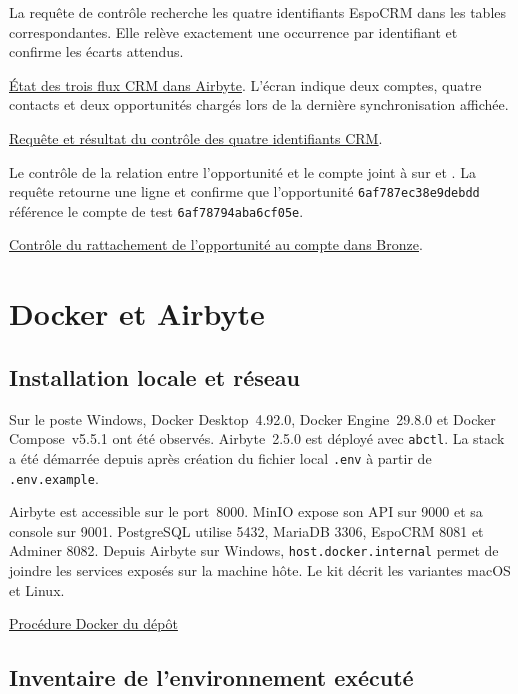 \documentclass[11pt,a4paper]{article}
\newcommand{\code}[1]{\texttt{#1}}
\newcommand{\preuve}[2]{%
  \href{https://github.com/MAHDIghr/projet_big_data_starter/blob/27cc8348f6737a75bb24a40d6d8cda3ae54996b3/preuves/#1}{\textcolor{encre}{\underline{#2}}}}
\begin{document}
La requête de contrôle recherche les quatre identifiants EspoCRM
dans les tables correspondantes. Elle relève exactement une
occurrence par identifiant et confirme les écarts attendus.

\preuve{crm/crm_03_sync_delta_airbyte.png}{État des trois flux CRM dans Airbyte}.
L'écran indique deux comptes, quatre contacts et deux opportunités
chargés lors de la dernière synchronisation affichée.

\preuve{crm/crm_04_delta_identifiants_bronze.png}{Requête et résultat du contrôle des quatre identifiants CRM}.

Le contrôle de la relation entre l'opportunité et le compte joint
 à 
sur  et . La requête
retourne une ligne et confirme que l'opportunité
\code{6af787ec38e9debdd} référence le compte de test
\code{6af78794aba6cf05e}.

\preuve{crm/crm_05_rattachement_opportunite_bronze.png}{Contrôle du rattachement de l'opportunité au compte dans Bronze}.

\section{Docker et Airbyte}
\label{sec:docker-airbyte}

\subsection{Installation locale et réseau}

Sur le poste Windows, Docker Desktop~4.92.0, Docker Engine~29.8.0
et Docker Compose~v5.5.1 ont été observés. Airbyte~2.5.0 est déployé
avec \code{abctl}. La stack a été démarrée depuis 
après création du fichier local \code{.env} à partir de
\code{.env.example}.

Airbyte est accessible sur le port~8000. MinIO expose son API sur
9000 et sa console sur 9001. PostgreSQL utilise 5432, MariaDB 3306,
EspoCRM 8081 et Adminer 8082. Depuis Airbyte sur Windows,
\code{host.docker.internal} permet de joindre les services exposés
sur la machine hôte. Le kit décrit les variantes macOS et Linux.

\href{https://github.com/MAHDIghr/projet_big_data_starter/blob/main/compose/README_DOCKER.md}{Procédure Docker du dépôt}

\subsection{Inventaire de l'environnement exécuté}
\end{document}
